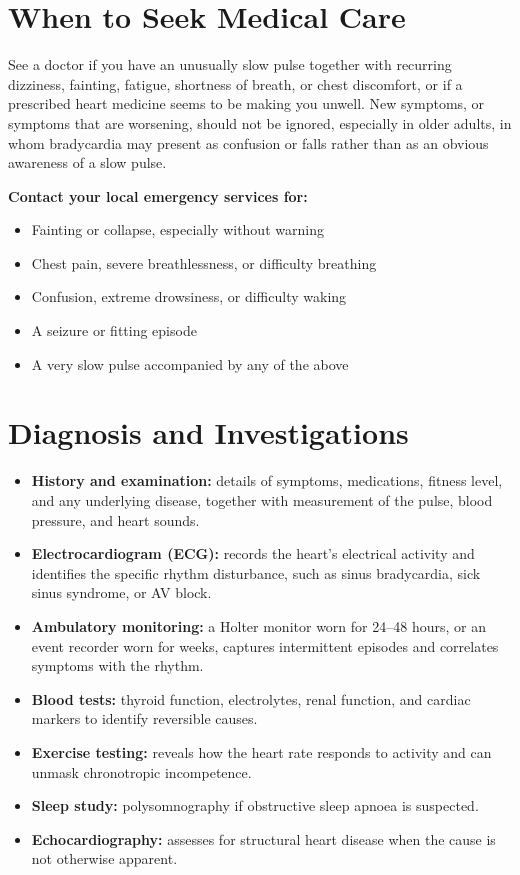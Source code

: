 \section*{When to Seek Medical Care}
See a doctor if you have an unusually slow pulse together with recurring dizziness, fainting, fatigue, shortness of breath, or chest discomfort, or if a prescribed heart medicine seems to be making you unwell. New symptoms, or symptoms that are worsening, should not be ignored, especially in older adults, in whom bradycardia may present as confusion or falls rather than as an obvious awareness of a slow pulse.

\textbf{Contact your local emergency services for:}
\begin{itemize}
    \item Fainting or collapse, especially without warning
    \item Chest pain, severe breathlessness, or difficulty breathing
    \item Confusion, extreme drowsiness, or difficulty waking
    \item A seizure or fitting episode
    \item A very slow pulse accompanied by any of the above
\end{itemize}

\section*{Diagnosis and Investigations}
\begin{itemize}
    \item \textbf{History and examination:} details of symptoms, medications, fitness level, and any underlying disease, together with measurement of the pulse, blood pressure, and heart sounds.
    \item \textbf{Electrocardiogram (ECG):} records the heart's electrical activity and identifies the specific rhythm disturbance, such as sinus bradycardia, sick sinus syndrome, or AV block.
    \item \textbf{Ambulatory monitoring:} a Holter monitor worn for 24--48 hours, or an event recorder worn for weeks, captures intermittent episodes and correlates symptoms with the rhythm.
    \item \textbf{Blood tests:} thyroid function, electrolytes, renal function, and cardiac markers to identify reversible causes.
    \item \textbf{Exercise testing:} reveals how the heart rate responds to activity and can unmask chronotropic incompetence.
    \item \textbf{Sleep study:} polysomnography if obstructive sleep apnoea is suspected.
    \item \textbf{Echocardiography:} assesses for structural heart disease when the cause is not otherwise apparent.
\end{itemize}

